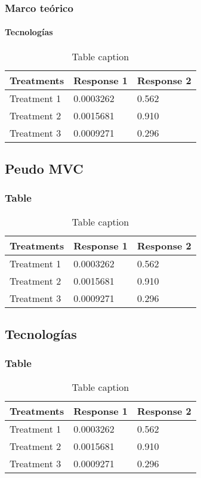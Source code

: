 \documentclass{beamer}
\begin{document}

\begin{frame}
\frametitle{Marco teórico}
\framesubtitle{Tecnologías}
\begin{table}
\begin{tabular}{l l l}
\toprule
\textbf{Treatments} & \textbf{Response 1} & \textbf{Response 2}\\
\midrule
Treatment 1 & 0.0003262 & 0.562 \\
Treatment 2 & 0.0015681 & 0.910 \\
Treatment 3 & 0.0009271 & 0.296 \\
\bottomrule
\end{tabular}
\caption{Table caption}
\end{table}
\end{frame}

\subsection{Peudo MVC} 
\begin{frame}
\frametitle{Table}
\begin{table}
\begin{tabular}{l l l}
\toprule
\textbf{Treatments} & \textbf{Response 1} & \textbf{Response 2}\\
\midrule
Treatment 1 & 0.0003262 & 0.562 \\
Treatment 2 & 0.0015681 & 0.910 \\
Treatment 3 & 0.0009271 & 0.296 \\
\bottomrule
\end{tabular}
\caption{Table caption}
\end{table}
\end{frame}
\subsection{Tecnologías} 
\begin{frame}
\frametitle{Table}
\begin{table}
\begin{tabular}{l l l}
\toprule
\textbf{Treatments} & \textbf{Response 1} & \textbf{Response 2}\\
\midrule
Treatment 1 & 0.0003262 & 0.562 \\
Treatment 2 & 0.0015681 & 0.910 \\
Treatment 3 & 0.0009271 & 0.296 \\
\bottomrule
\end{tabular}
\caption{Table caption}
\end{table}
\end{frame}
\end{document}
